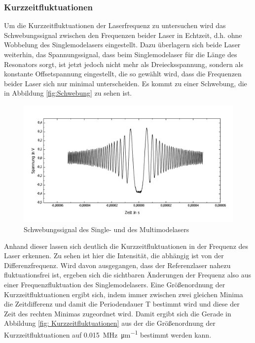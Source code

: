 \documentclass[a4paper,twoside,final]{article}
\begin{document}
\subsubsection{Kurzzeitfluktuationen}
Um die Kurzzeitfluktuationen der Laserfrequenz zu untersuchen wird das Schwebungssignal zwischen den Frequenzen beider Laser in Echtzeit, d.h. ohne Wobbelung des Singlemodelasers eingestellt. Dazu überlagern sich beide Laser weiterhin, das Spannungssignal, dass beim Singlemodelaser für die Länge des Resonators sorgt, ist jetzt jedoch nicht mehr als Dreiecksspannung, sondern als konstante Offsetspannung eingestellt, die so gewählt wird, dass die Frequenzen beider Laser sich nur minimal unterscheiden. Es kommt zu einer Schwebung, die in Abbildung \ref{fig:Schwebung} zu sehen ist.

\begin{figure}[htp]
    \centering
        \includegraphics[width=1\textwidth]{Bilder/Schwebungssignal.pdf}
    \caption{Schwebungssignal des Single- und des Multimodelasers}
    \label{fig:Schwebungssignal}
\end{figure}

Anhand dieser lassen sich deutlich die Kurzzeitfluktuationen in der Frequenz des Laser erkennen. Zu sehen ist hier die Intensität, die abhängig ist von der Differenzfrequenz. Wird davon ausgegangen, dass der Referenzlaser nahezu fluktuationsfrei ist, ergeben sich die sichtbaren Änderungen der Frequenz also aus einer Frequenzfluktuation des Singlemodelasers. Eine Größenordnung der Kurzzeitfluktuationen ergibt sich, indem immer zwischen zwei gleichen Minima die Zeitdifferenz und damit die Periodendauer T bestimmt wird und diese der Zeit des rechten Minimas zugeordnet wird. Damit ergibt sich die Gerade in Abbildung \ref{fig: Kurzzeitfluktuationen} aus der die Größenordnung der Kurzzeitfluktuationen auf \SI{0,015}{\mega\hertz\per\micro\meter} bestimmt werden kann.
\end{document}
